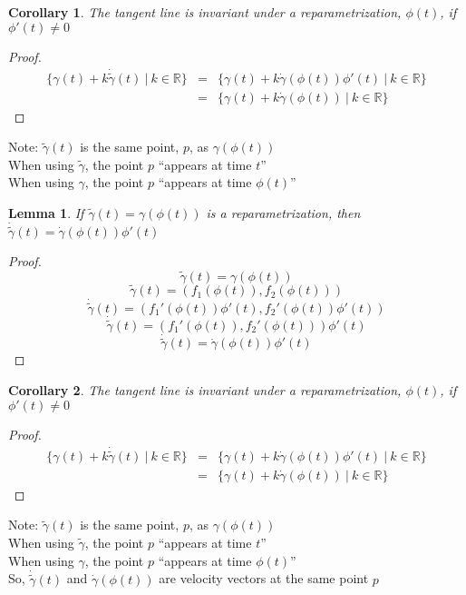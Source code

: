 \documentclass[twocolumn,20pt,fleqn]{extarticle}
\theoremstyle{plain}
\newtheorem*{lemma}{Lemma}
\newtheorem*{corollary}{Corollary}
\theoremstyle{definition}
\theoremstyle{remark}
\begin{document}
\begin{corollary}
The tangent line is invariant under a reparametrization, $\phi(t)$,  if $\phi'(t)\neq 0$ 
\end{corollary}
\begin{proof}
\begin{eqnarray*}
\{\gamma(t) + k\dot{\tilde{\gamma}}(t) \ |\ k\in \mathbb{R}\} &=& \{\gamma(t) + k\dot{\gamma}(\phi(t))\phi'(t) \ |\ k\in \mathbb{R}\} \\ 
                                                  &=& \{\gamma(t) + k\dot{\gamma}(\phi(t)) \ |\ k\in \mathbb{R}\}
\end{eqnarray*}
\end{proof}
\newpage
Note: $\tilde{\gamma}(t)$ is the same point, $p$, as $\gamma(\phi(t))$\\
When using $\tilde{\gamma}$, the point $p$ ``appears at time $t$''\\
When using $\gamma$, the point $p$ ``appears at time $\phi(t)$''


\clearpage



\begin{lemma}
If $\tilde{\gamma}(t) = \gamma(\phi(t))$ is a reparametrization, then $\dot{\tilde{\gamma}}(t) = \dot{\gamma}(\phi(t))\phi'(t)$
\end{lemma}
\begin{proof}
\[\tilde{\gamma}(t) = \gamma(\phi(t))\]
\[\tilde{\gamma}(t) = (f_1(\phi(t)), f_2(\phi(t)))\]
\[\dot{\tilde{\gamma}}(t) = (f_1'(\phi(t))\phi'(t), f_2'(\phi(t))\phi'(t))\]
\[\dot{\tilde{\gamma}}(t) = (f_1'(\phi(t)), f_2'(\phi(t)))\phi'(t)\]
\[\dot{\tilde{\gamma}}(t) = \dot{\gamma}(\phi(t))\phi'(t)\]
\end{proof}

\begin{corollary}
The tangent line is invariant under a reparametrization, $\phi(t)$,  if $\phi'(t)\neq 0$ 
\end{corollary}
\begin{proof}
\begin{eqnarray*}
\{\gamma(t) + k\dot{\tilde{\gamma}}(t) \ |\ k\in \mathbb{R}\} &=& \{\gamma(t) + k\dot{\gamma}(\phi(t))\phi'(t) \ |\ k\in \mathbb{R}\} \\ 
                                                  &=& \{\gamma(t) + k\dot{\gamma}(\phi(t)) \ |\ k\in \mathbb{R}\}
\end{eqnarray*}
\end{proof}
\newpage
Note: $\tilde{\gamma}(t)$ is the same point, $p$, as $\gamma(\phi(t))$\\
When using $\tilde{\gamma}$, the point $p$ ``appears at time $t$''\\
When using $\gamma$, the point $p$ ``appears at time $\phi(t)$''\\
So, $\dot{\tilde{\gamma}}(t)$ and $\dot{\gamma}(\phi(t))$ are velocity vectors at the same point $p$
\end{document}
